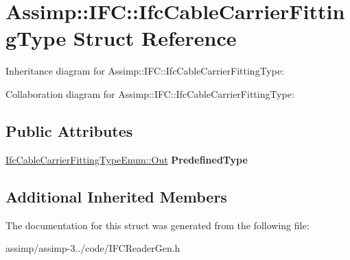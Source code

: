 \hypertarget{struct_assimp_1_1_i_f_c_1_1_ifc_cable_carrier_fitting_type}{\section{Assimp\+:\+:I\+F\+C\+:\+:Ifc\+Cable\+Carrier\+Fitting\+Type Struct Reference}
\label{struct_assimp_1_1_i_f_c_1_1_ifc_cable_carrier_fitting_type}
}


Inheritance diagram for Assimp\+:\+:I\+F\+C\+:\+:Ifc\+Cable\+Carrier\+Fitting\+Type\+:


Collaboration diagram for Assimp\+:\+:I\+F\+C\+:\+:Ifc\+Cable\+Carrier\+Fitting\+Type\+:
\subsection*{Public Attributes}
\begin{DoxyCompactItemize}
\item 
\hypertarget{struct_assimp_1_1_i_f_c_1_1_ifc_cable_carrier_fitting_type_a8db90d76726ca9227425325803aadc23}{\hyperlink{classboost_1_1shared__ptr}{Ifc\+Cable\+Carrier\+Fitting\+Type\+Enum\+::\+Out} {\bfseries Predefined\+Type}}\label{struct_assimp_1_1_i_f_c_1_1_ifc_cable_carrier_fitting_type_a8db90d76726ca9227425325803aadc23}

\end{DoxyCompactItemize}
\subsection*{Additional Inherited Members}


The documentation for this struct was generated from the following file\+:\begin{DoxyCompactItemize}
\item 
assimp/assimp-\/3../code/I\+F\+C\+Reader\+Gen.\+h\end{DoxyCompactItemize}
